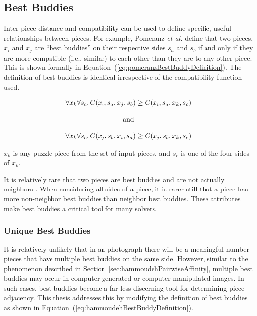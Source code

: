 \documentclass{report}
\def\eref#1{(\ref{#1})}
\begin{document}
\subsection{Best Buddies}\label{sec:bestBuddies}

Inter-piece distance and compatibility can be used to define specific, useful relationships between pieces.  For example, Pomeranz \textit{et al.} define that two pieces, $x_i$ and $x_j$ are ``best buddies'' on their respective sides $s_a$ and $s_b$ if and only if they are more compatible (i.e., similar) to each other than they are to any other piece.  This is shown formally in Equation~\eref{eq:pomeranzBestBuddyDefinition}.  The definition of best buddies is identical irrespective of the compatibility function used.

\begin{equation} \label{eq:pomeranzBestBuddyDefinition}
\centering
\begin{split}
	\begin{matrix}
		\forall{x_{k}}\forall{s_c},C(x_i, s_a, x_j, s_b) \geq C(x_i, s_a, x_k, s_c)
		\\
		\\
		\textnormal{and}
		\\
		\\
		\forall{x_{k}}\forall{s_c},C(x_j, s_b, x_i, s_a) \geq C(x_j, s_b, x_k, s_c)
	\end{matrix}
\end{split}
\end{equation}

\noindent
$x_{k}$ is any puzzle piece from the set of input pieces, and $s_c$ is one of the four sides of $x_k$.

It is relatively rare that two pieces are best buddies and are not actually neighbors \cite{paikin2015}.  When considering all sides of a piece, it is rarer still that a piece has more non-neighbor best buddies than neighbor best buddies.  These attributes make best buddies a critical tool for many solvers.

\subsubsection{Unique Best Buddies}\label{sec:improvedBestBuddies}

It is relatively unlikely that in an photograph there will be a meaningful number pieces that have multiple best buddies on the same side.  However, similar to the phenomenon described in Section~\ref{sec:hammoudehPairwiseAffinity}, multiple best buddies may occur in computer generated or computer manipulated images.  In such cases, best buddies become a far less discerning tool for determining piece adjacency.  This thesis addresses this by modifying the definition of best buddies as shown in Equation~\eref{eq:hammoudehBestBuddyDefinition}.
\end{document}
